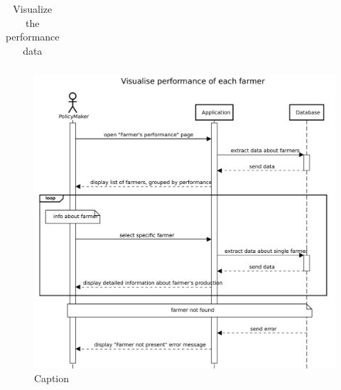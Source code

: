 \begin{table}[H]
\begin{tabular}{|l|p{}|}
    \end{tabular}
    \caption{\label{tab:visualize_farmer_performance}Visualize the performance data} %
\end{table}

\begin{figure}[H]
    \centering
    \includegraphics[scale=0.5]{Images/Sequence diagrams/PolicyMaker - visualize performance.pdf}
    \caption{Caption}
    \label{fig:my_label}
\end{figure}

